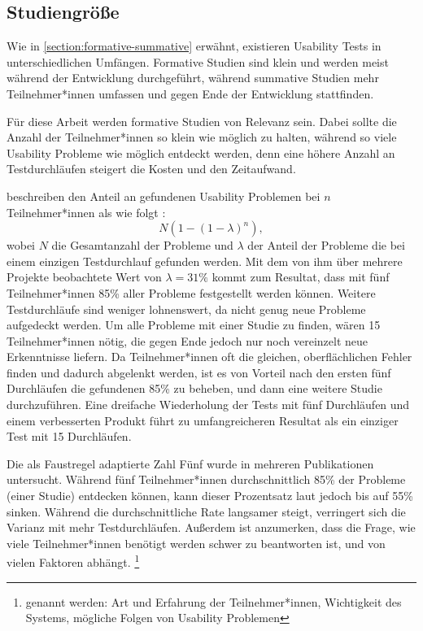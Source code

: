 \subsection{Studiengröße}
Wie in \ref{section:formative-summative} erwähnt, existieren Usability Tests in unterschiedlichen Umfängen. Formative Studien sind klein und werden meist während der Entwicklung durchgeführt, während summative Studien mehr Teilnehmer*innen umfassen und gegen Ende der Entwicklung stattfinden.

Für diese Arbeit werden formative Studien von Relevanz sein. Dabei sollte die Anzahl der Teilnehmer*innen so klein wie möglich zu halten, während so viele Usability Probleme wie möglich entdeckt werden, denn eine höhere Anzahl an Testdurchläufen steigert die Kosten und den Zeitaufwand. \cite{faulknerFiveuserAssumption2003} \cite{nielsenWhyYou2000}

\citeauthor{nielsenMathematicalModel1993} beschreiben den Anteil an gefundenen Usability Problemen bei $n$ Teilnehmer*innen als wie folgt \cite{nielsenMathematicalModel1993}:
\begin{equation}
\label{equation:finding-usability-problems}
  N(1-(1-\lambda{})^n),
\end{equation}
wobei $N$ die Gesamtanzahl der Probleme und $\lambda{}$ der Anteil der Probleme die bei einem einzigen Testdurchlauf gefunden werden. Mit dem von ihm über mehrere Projekte beobachtete Wert von $\lambda{}=31\%$ kommt \citeauthor{nielsenWhyYou2000} zum Resultat, dass mit fünf Teilnehmer*innen 85\% aller Probleme festgestellt werden können. \cite{nielsenWhyYou2000} Weitere Testdurchläufe sind weniger lohnenswert, da nicht genug neue Probleme aufgedeckt werden. Um alle Probleme mit einer Studie zu finden, wären 15 Teilnehmer*innen nötig, die gegen Ende jedoch nur noch vereinzelt neue Erkenntnisse liefern. Da Teilnehmer*innen oft die gleichen, oberflächlichen Fehler finden und dadurch abgelenkt werden, ist es von Vorteil nach den ersten fünf Durchläufen die gefundenen 85\% zu beheben, und dann eine weitere Studie durchzuführen. Eine dreifache Wiederholung der Tests mit fünf Durchläufen und einem verbesserten Produkt führt zu umfangreicheren Resultat als ein einziger Test mit 15 Durchläufen. \cite{nielsenWhyYou2000}

Die als Faustregel adaptierte Zahl Fünf wurde in mehreren Publikationen untersucht. Während fünf Teilnehmer*innen durchschnittlich 85\% der Probleme (einer Studie) entdecken können, kann dieser Prozentsatz laut \citeauthor{faulknerFiveuserAssumption2003} jedoch bis auf 55\% sinken. Während die durchschnittliche Rate langsamer steigt, verringert sich die Varianz mit mehr Testdurchläufen. Außerdem ist anzumerken, dass die Frage, wie viele Teilnehmer*innen benötigt werden schwer zu  beantworten ist, und von vielen Faktoren abhängt. \footnote{genannt werden: Art und Erfahrung der Teilnehmer*innen, Wichtigkeit des Systems, mögliche Folgen von Usability Problemen}
\cite{faulknerFiveuserAssumption2003}

